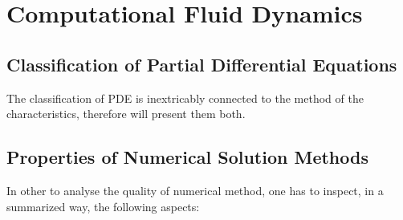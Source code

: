 \chapter{Computational Fluid Dynamics}




\section{Classification of Partial Differential Equations}
 The classification of PDE is inextricably connected to the method of the characteristics, therefore will present them both.






















 \section{Properties of Numerical Solution Methods}
 In other to analyse the quality of numerical method, one has to inspect, in a summarized way, the following aspects:


